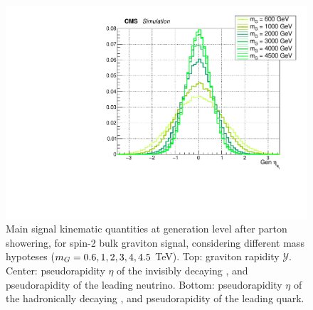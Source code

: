 \begin{figure}[!htb]
\begin{center}
     \includegraphics[width=.495\textwidth]{Gen_v9/XZZInv_g_Had1Eta.pdf}%
   \end{center}
   \caption{Main signal kinematic quantities at generation level after parton showering, for spin-2 bulk graviton signal, considering different mass hypoteses ($m_{G} = 0.6, 1, 2, 3, 4, 4.5$ TeV). Top: graviton rapidity $\mathcal{Y}$. Center: pseudorapidity $\eta$ of the invisibly decaying \Z, and pseudorapidity of the leading neutrino. Bottom: pseudorapidity $\eta$ of the hadronically decaying \Z, and pseudorapidity of the leading quark.}
   \label{fig:genGravSignal2}
 \end{figure}

